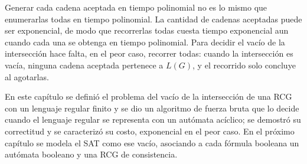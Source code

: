 Generar cada cadena aceptada en tiempo polinomial no es lo mismo que
enumerarlas todas en tiempo polinomial. La cantidad de cadenas
aceptadas puede ser exponencial, de modo que recorrerlas todas cuesta
tiempo exponencial aun cuando cada una se obtenga en tiempo polinomial.
Para decidir el vacío de la intersección hace falta, en el peor caso,
recorrer todas: cuando la intersección es vacía, ninguna cadena aceptada
pertenece a $L(G)$, y el recorrido solo concluye al agotarlas.

En este capítulo se definió el problema del vacío de la intersección de
una RCG con un lenguaje regular finito y se dio un algoritmo de fuerza
bruta que lo decide cuando el lenguaje regular se representa con un
autómata acíclico; se demostró su correctitud y se caracterizó su costo,
exponencial en el peor caso. En el próximo capítulo se modela el SAT
como ese vacío, asociando a cada fórmula booleana un autómata booleano y
una RCG de consistencia.

